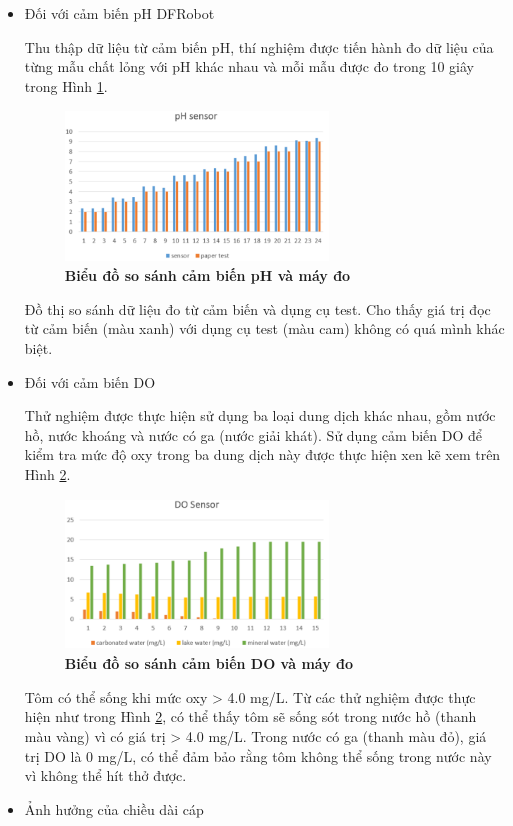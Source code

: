\documentclass{article} %
\begin{document}
	\begin{itemize}
		\item Đối với cảm biến pH DFRobot
		
		Thu thập dữ liệu từ cảm biến pH, thí nghiệm được tiến hành đo dữ liệu của từng mẫu chất lỏng với pH khác nhau và mỗi mẫu được đo trong 10 giây trong Hình \ref{ktPH}.
		\begin{figure}[!ht]
			\centering
			\includegraphics[width=7cm,height=4cm]{Images/ktPH.png}
			\caption[Biểu đồ so sánh cảm biến pH và máy đo \cite{zaini2020data}]{\bfseries \fontsize{12pt}{0pt}\selectfont Biểu đồ so sánh cảm biến pH và máy đo\cite{zaini2020data}}
			\label{ktPH}
		\end{figure}   
		
		Đồ thị so sánh dữ liệu đo từ cảm biến và dụng cụ test. Cho thấy giá trị đọc từ cảm biến (màu xanh) với dụng cụ test (màu cam) không có quá mình khác biệt.
		\item Đối với cảm biến DO
		
		Thử nghiệm được thực hiện sử dụng ba loại dung dịch khác nhau, gồm nước hồ, nước khoáng và nước có ga (nước giải khát). Sử dụng cảm biến DO để kiểm tra mức độ oxy trong ba dung dịch này được thực hiện xen kẽ xem trên Hình \ref{ktDo}.
		
		\begin{figure}[!ht]
			\centering
			\includegraphics[width=7cm,height=4cm]{Images/ktDo.png}
			\caption[Biểu đồ so sánh cảm biến DO và máy đo \cite{zaini2020data}]{\bfseries \fontsize{12pt}{0pt}\selectfont Biểu đồ so sánh cảm biến DO và máy đo\cite{zaini2020data}}
			\label{ktDo}
		\end{figure}  
		
		Tôm có thể sống khi mức oxy > 4.0 mg/L. Từ các thử nghiệm được thực hiện như trong Hình \ref{ktDo}, có thể thấy tôm sẽ sống sót trong nước hồ (thanh màu vàng) vì có giá trị > 4.0 mg/L. Trong nước có ga (thanh màu đỏ), giá trị DO là 0 mg/L, có thể đảm bảo rằng tôm không thể sống trong nước này vì không thể hít thở được.
		\item Ảnh hưởng của chiều dài cáp
		

\end{itemize}
\end{document}
